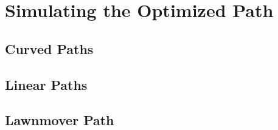 \chapter{Simulating the Optimized Path}

\section{Curved Paths}


\section{Linear Paths}


\section{Lawnmover Path}